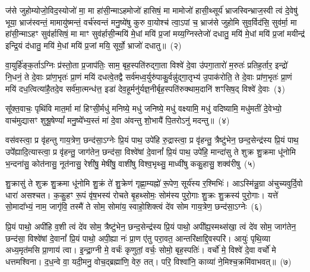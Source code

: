ज॑से जुहोम्योजो॒विद॒स्योजो॑ मा॒ मा हा॑सी॒न्मा\-ऽहमोजो॑ हासिषं॒ मा मामोजो॑ हासी॒थ्सूर्य॑ भ्राजस्विन्भ्राज॒स्वी त्वं दे॒वेषु॑ भूया॒ भ्राज॑स्वन्तं॒ मामायु॑ष्मन्तं॒ वर्च॑स्वन्तं मनु॒ष्ये॑षु कुरु वा॒योश्च॑ त्वा॒\-ऽपां च॒ भ्राज॑से जुहोमि सुव॒र्विद॑सि॒ सुव॑र्मा॒ मा हा॑सी॒न्मा\-ऽहꣳ सुव॑र्\mbox{}हासिषं॒ मा माꣳ सुव॑र्\mbox{}हासी॒न्मयि॑ मे॒धां मयि॑ प्र॒जां मय्य॒ग्निस्तेजो॑ दधातु॒ मयि॑ मे॒धां मयि॑ प्र॒जां मयीन्द्र॑ इन्द्रि॒यं द॑धातु॒ मयि॑ मे॒धां मयि॑ प्र॒जां मयि॒ सूर्यो॒ भ्राजो॑ दधातु॥~(२)

{\anuvakamend[{क्ष॒त्रस्य॑ च॒ मयि॒ त्रयो॑विꣳशतिश्च}]}%

वा॒युर्\mbox{}हि॑ङ्क॒र्ता\-ऽग्निः प्र॑स्तो॒ता प्र॒जा\-प॑तिः॒ साम॒ बृह॒स्पति॑रुद्गा॒ता विश्वे॑ दे॒वा उ॑पगा॒तारो॑ म॒रुतः॑ प्रतिह॒र्तार॒ इन्द्रो॑ नि॒धनं॒ ते दे॒वाः प्रा॑ण॒भृतः॑ प्रा॒णं मयि॑ दधत्वे॒तद्वै सर्व॑मध्व॒र्युरु॑पाकु॒र्वन्नु॑द्गा॒तृभ्य॑ उ॒पा\-क॑रोति॒ ते दे॒वाः प्रा॑ण॒भृतः॑ प्रा॒णं मयि॑ दध॒त्वित्या॑है॒तदे॒व सर्व॑मा॒त्मन्ध॑त्त॒ इडा॑ देव॒हूर्मनु॑र्यज्ञ॒नीर्बृह॒स्पति॑रुक्थाम॒दानि॑ शꣳसिष॒द् विश्वे॑ दे॒वाः~(३)

सू᳚क्त॒वाचः॒ पृथि॑वि मात॒र्मा मा॑ हिꣳसी॒र्मधु॑ मनिष्ये॒ मधु॑ जनिष्ये॒ मधु॑ वक्ष्यामि॒ मधु॑ वदिष्यामि॒ मधु॑मतीं दे॒वेभ्यो॒ वाच॑मुद्यासꣳ शुश्रू॒षेण्यां᳚ मनु॒ष्ये᳚भ्य॒स्तं मा॑ दे॒वा अ॑वन्तु शो॒भायै॑ पि॒तरो\-ऽनु॑ मदन्तु॥~(४)

{\anuvakamend[{श॒ꣳ॒सि॒ष॒द्विश्वे॑ दे॒वा अ॒ष्टाविꣳ॑शतिश्च}]}%

वस॑वस्त्वा॒ प्र वृ॑हन्तु गाय॒त्रेण॒ छन्द॑सा॒\-ऽग्नेः प्रि॒यं पाथ॒ उपे॑हि रु॒द्रास्त्वा॒ प्र वृ॑हन्तु॒ त्रैष्टु॑भेन॒ छन्द॒सेन्द्र॑स्य प्रि॒यं पाथ॒ उपे᳚ह्यादि॒त्यास्त्वा॒ प्र वृ॑हन्तु॒ जाग॑तेन॒ छन्द॑सा॒ विश्वे॑षां दे॒वानां᳚ प्रि॒यं पाथ॒ उपे॑हि॒ मान्दा॑सु ते शुक्र शु॒क्रमा धू॑नोमि भ॒न्दना॑सु॒ कोत॑नासु॒ नूत॑नासु॒ रेशी॑षु॒ मेषी॑षु॒ वाशी॑षु विश्व॒भृथ्सु॒ माध्वी॑षु ककु॒हासु॒ शक्व॑रीषु~(५)

शु॒क्रासु॑ ते शुक्र शु॒क्रमा धू॑नोमि शु॒क्रं ते॑ शु॒क्रेण॑ गृह्णा॒म्यह्नो॑ रू॒पेण॒ सूर्य॑स्य र॒श्मिभिः॑। आ\-ऽस्मि॑न्नु॒ग्रा अ॑चुच्यवुर्दि॒वो धारा॑ असश्चत। क॒कु॒हꣳ रू॒पं वृ॑ष॒भस्य॑ रोचते बृ॒हथ्सोमः॒ सोम॑स्य पुरो॒गाः शु॒क्रः शु॒क्रस्य॑ पुरो॒गाः। यत्ते॑ सो॒मादा᳚भ्यं॒ नाम॒ जागृ॑वि॒ तस्मै॑ ते सोम॒ सोमा॑य॒ स्वाहो॒शिक्त्वं दे॑व सोम गाय॒त्रेण॒ छन्द॑सा॒\-ऽग्नेः~(६)

प्रि॒यं पाथो॒ अपी॑हि व॒शी त्वं दे॑व सोम॒ त्रैष्टु॑भेन॒ छन्द॒सेन्द्र॑स्य प्रि॒यं पाथो॒ अपी᳚ह्य॒स्मथ्स॑खा॒ त्वं दे॑व सोम॒ जाग॑तेन॒ छन्द॑सा॒ विश्वे॑षां दे॒वानां᳚ प्रि॒यं पाथो॒ अपी॒ह्या नः॑ प्रा॒ण ए॑तु परा॒वत॒ आन्तरि॑क्षाद्दि॒वस्परि॑। आयुः॑ पृथि॒व्या अध्य॒मृत॑मसि प्रा॒णाय॑ त्वा। इ॒न्द्रा॒ग्नी मे॒ वर्चः॑ कृणुतां॒ वर्चः॒ सोमो॒ बृह॒स्पतिः॑। वर्चो॑ मे॒ विश्वे॑ दे॒वा वर्चो॑ मे धत्तमश्विना। द॒ध॒न्वे वा॒ यदी॒मनु॒ वोच॒द्ब्रह्मा॑णि॒ वेरु॒ तत्। परि॒ विश्वा॑नि॒ काव्या॑ ने॒मिश्च॒क्रमि॑वाभवत्॥~(७)

